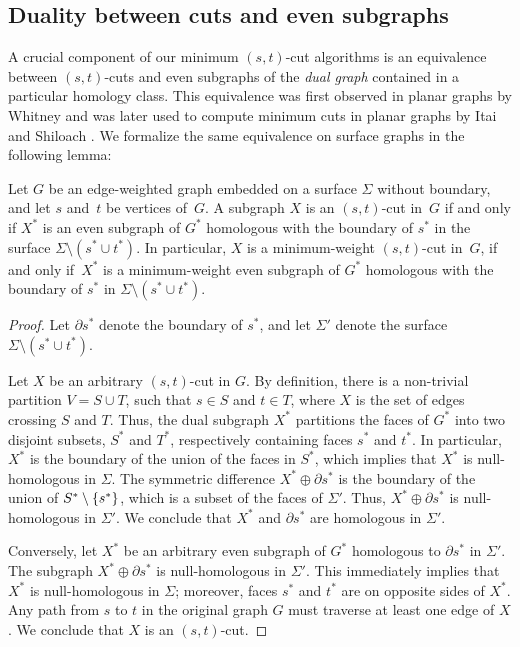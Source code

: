 \documentclass[letterpaper,review]{siamart190516}
\def\Cut{X}
\begin{document}
\subsection{Duality between cuts and even subgraphs}
\label{SS:duality}


A crucial component of our minimum $(s,t)$-cut algorithms is an equivalence between $(s,t)$-cuts and even subgraphs of the \emph{dual graph} contained in a particular homology class.  This equivalence was first observed in planar graphs by Whitney \cite{w-pg-33} and was later used to compute minimum cuts in planar graphs by Itai and Shiloach \cite{is-mfpn-79}.
We formalize the same equivalence on surface graphs in the following lemma:

\begin{lemma}
\label{lem:cut-duality}
Let $G$ be an edge-weighted graph embedded on a surface $\Sigma$ without boundary, and let $s$ and~$t$ be vertices of~$G$.  A subgraph $\Cut$ is an $(s,t)$-cut in~$G$ if and only if $\Cut^*$ is an even subgraph of $G^*$ homologous with the boundary of $s^*$ in the surface $\Sigma\setminus(s^*\cup t^*)$.
In particular, $X$ is a minimum-weight $(s,t)$-cut in~$G$, if and only if~$\Cut^*$ is a minimum-weight even subgraph of $G^*$ homologous with the boundary of $s^*$ in $\Sigma\setminus(s^*\cup t^*)$.
\end{lemma}

\begin{proof}
Let $\partial s^*$ denote the boundary of $s^*$, and let $\Sigma'$ denote the surface $\Sigma\setminus {(s^*\cup t^*)}$.

Let $\Cut$ be an arbitrary $(s,t)$-cut in $G$.  By definition, there is a non-trivial partition $V = S\cup T$, such that $s\in S$ and $t\in T$, where $\Cut$ is the set of edges crossing $S$ and $T$.
Thus, the dual subgraph $\Cut^*$ partitions the faces of $G^*$ into two disjoint subsets, $S^*$ and $T^*$, respectively containing faces $s^*$ and $t^*$.  In particular, $\Cut^*$ is the boundary of the union of the faces in $S^*$, which implies that $\Cut^*$ is null-homologous in $\Sigma$.  The symmetric difference $\Cut^* \oplus \partial s^*$ is the boundary of the union of $S^* \setminus\{ s^* \}$, which is a subset of the faces of $\Sigma'$.  Thus, $\Cut^*\oplus \partial s^*$ is null-homologous in $\Sigma'$.  We conclude that $\Cut^*$ and  $\partial s^*$ are homologous in $\Sigma'$.

Conversely, let $\Cut^*$ be an arbitrary even subgraph of $G^*$ homologous to $\partial s^*$ in $\Sigma'$.  The subgraph $\Cut^*\oplus \partial s^*$ is null-homologous in $\Sigma'$.  This immediately implies that $X^*$ is null-homologous in $\Sigma$; moreover, faces $s^*$ and $t^*$ are on opposite sides of $X^*$.  Any path from $s$ to $t$ in the original graph $G$ must traverse at least one edge of $\Cut$.  We conclude that $\Cut$ is an $(s,t)$-cut.
\end{proof}
\end{document}
